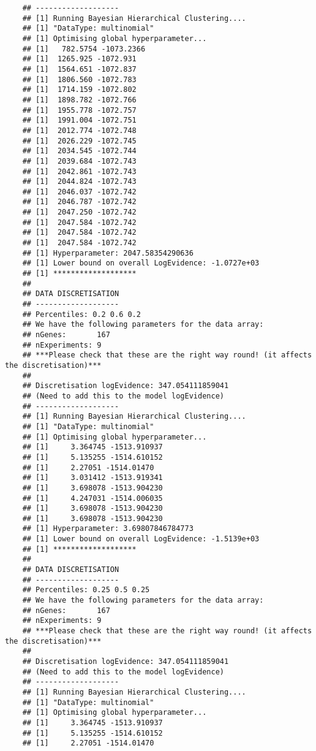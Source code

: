 \begin{verbatim}
    ## -------------------
    ## [1] Running Bayesian Hierarchical Clustering....
    ## [1] "DataType: multinomial"
    ## [1] Optimising global hyperparameter...
    ## [1]   782.5754 -1073.2366
    ## [1]  1265.925 -1072.931
    ## [1]  1564.651 -1072.837
    ## [1]  1806.560 -1072.783
    ## [1]  1714.159 -1072.802
    ## [1]  1898.782 -1072.766
    ## [1]  1955.778 -1072.757
    ## [1]  1991.004 -1072.751
    ## [1]  2012.774 -1072.748
    ## [1]  2026.229 -1072.745
    ## [1]  2034.545 -1072.744
    ## [1]  2039.684 -1072.743
    ## [1]  2042.861 -1072.743
    ## [1]  2044.824 -1072.743
    ## [1]  2046.037 -1072.742
    ## [1]  2046.787 -1072.742
    ## [1]  2047.250 -1072.742
    ## [1]  2047.584 -1072.742
    ## [1]  2047.584 -1072.742
    ## [1]  2047.584 -1072.742
    ## [1] Hyperparameter: 2047.58354290636
    ## [1] Lower bound on overall LogEvidence: -1.0727e+03
    ## [1] *******************
    ## 
    ## DATA DISCRETISATION
    ## -------------------
    ## Percentiles: 0.2 0.6 0.2 
    ## We have the following parameters for the data array:
    ## nGenes:       167
    ## nExperiments: 9
    ## ***Please check that these are the right way round! (it affects the discretisation)***
    ## 
    ## Discretisation logEvidence: 347.054111859041
    ## (Need to add this to the model logEvidence)
    ## -------------------
    ## [1] Running Bayesian Hierarchical Clustering....
    ## [1] "DataType: multinomial"
    ## [1] Optimising global hyperparameter...
    ## [1]     3.364745 -1513.910937
    ## [1]     5.135255 -1514.610152
    ## [1]     2.27051 -1514.01470
    ## [1]     3.031412 -1513.919341
    ## [1]     3.698078 -1513.904230
    ## [1]     4.247031 -1514.006035
    ## [1]     3.698078 -1513.904230
    ## [1]     3.698078 -1513.904230
    ## [1] Hyperparameter: 3.69807846784773
    ## [1] Lower bound on overall LogEvidence: -1.5139e+03
    ## [1] *******************
    ## 
    ## DATA DISCRETISATION
    ## -------------------
    ## Percentiles: 0.25 0.5 0.25 
    ## We have the following parameters for the data array:
    ## nGenes:       167
    ## nExperiments: 9
    ## ***Please check that these are the right way round! (it affects the discretisation)***
    ## 
    ## Discretisation logEvidence: 347.054111859041
    ## (Need to add this to the model logEvidence)
    ## -------------------
    ## [1] Running Bayesian Hierarchical Clustering....
    ## [1] "DataType: multinomial"
    ## [1] Optimising global hyperparameter...
    ## [1]     3.364745 -1513.910937
    ## [1]     5.135255 -1514.610152
    ## [1]     2.27051 -1514.01470

\end{verbatim}
